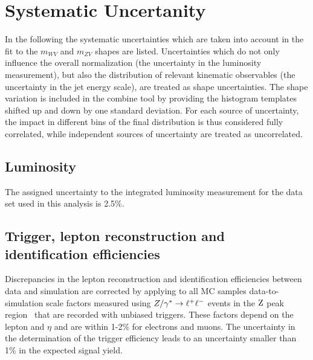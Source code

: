 \section{Systematic Uncertanity} %
\label{sec:systematic_uncertanity}
In the following the systematic uncertainties which are taken into account in the fit to the $m_{WV}$ and $m_{ZV}$ shapes are listed.  
Uncertainties which do not only influence the overall normalization (\eg the uncertainty in the luminosity measurement), but also the distribution of relevant kinematic observables (\eg the uncertainty in the jet energy scale), are treated as shape uncertainties.
The shape variation is included in the combine tool by providing the histogram templates shifted up and down by one standard deviation.
For each source of uncertainty, the impact in different bins of the final distribution is thus considered fully correlated, while independent sources of uncertainty are treated as uncorrelated. 

\subsection{Luminosity}

The assigned uncertainty to the integrated luminosity measurement for
the data set used in this analysis is 2.5\%.

\subsection{Trigger, lepton reconstruction and identification efficiencies}

Discrepancies in the lepton reconstruction and identification
efficiencies between data and simulation are corrected by applying
to all MC samples 
data-to-simulation scale factors measured using $Z/\gamma^*\to\ell^+\ell^-$ events in the $\mathrm{Z}$
peak region~\cite{Tag_probe} that are recorded with unbiased triggers. These factors
depend on the lepton \pt and $\eta$ and are within 1-2\% for electrons and muons.
The uncertainty in the determination of the trigger efficiency leads to an uncertainty smaller than 1\% in the expected signal yield. 


